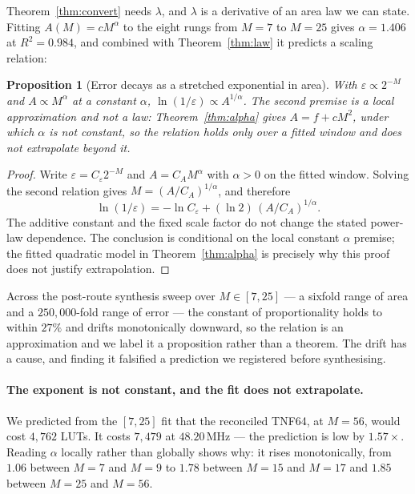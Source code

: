 \documentclass[11pt]{article}
\newtheorem{proposition}[theorem]{Proposition}
\theoremstyle{definition}
\begin{document}
Theorem~\ref{thm:convert} needs $\lambda$, and $\lambda$ is a derivative of an
area law we can state. Fitting $A(M) = cM^{\alpha}$ to the eight rungs from
$M{=}7$ to $M{=}25$ gives $\alpha = 1.406$ at $R^2 = 0.984$, and combined with
Theorem~\ref{thm:law} it predicts a scaling relation:

\begin{proposition}[Error decays as a stretched exponential in area]
\label{prop:stretched}
With $\varepsilon \propto 2^{-M}$ and $A \propto M^{\alpha}$ at a constant
$\alpha$, $\ln(1/\varepsilon) \propto A^{1/\alpha}$. The second premise is a local
approximation and not a law: Theorem~\ref{thm:alpha} gives $A = f + cM^{2}$, under
which $\alpha$ is not constant, so the relation holds only over a fitted window and
does not extrapolate beyond it.
\end{proposition}
\begin{proof}
Write $\varepsilon=C_{\varepsilon}2^{-M}$ and
$A=C_A M^{\alpha}$ with $\alpha>0$ on the fitted window.  Solving the
second relation gives $M=(A/C_A)^{1/\alpha}$, and therefore
\[
 \ln(1/\varepsilon)
 =-\ln C_{\varepsilon}+(\ln 2)\,(A/C_A)^{1/\alpha}.
\]
The additive constant and the fixed scale factor do not change the stated
power-law dependence.  The conclusion is conditional on the local constant
$\alpha$ premise; the fitted quadratic model in Theorem~\ref{thm:alpha}
is precisely why this proof does not justify extrapolation.
\end{proof}

Across the post-route synthesis sweep over $M \in [7,25]$ --- a sixfold range of area and a $250{,}000$-fold
range of error --- the constant of proportionality holds to within $27\%$ and
drifts monotonically downward, so the relation is an approximation and we label
it a proposition rather than a theorem. The drift has a cause, and finding it
falsified a prediction we registered before synthesising.

\paragraph{The exponent is not constant, and the fit does not extrapolate.} We
predicted from the $[7,25]$ fit that the reconciled TNF64, at $M = 56$, would
cost $4{,}762$ LUTs. It costs $7{,}479$ at $48.20$\,MHz --- the prediction is low
by $1.57\times$. Reading $\alpha$ locally rather than globally shows why: it rises
monotonically, from $1.06$ between $M{=}7$ and $M{=}9$ to $1.78$ between $M{=}15$
and $M{=}17$ and $1.85$ between $M{=}25$ and $M{=}56$.
\end{document}
